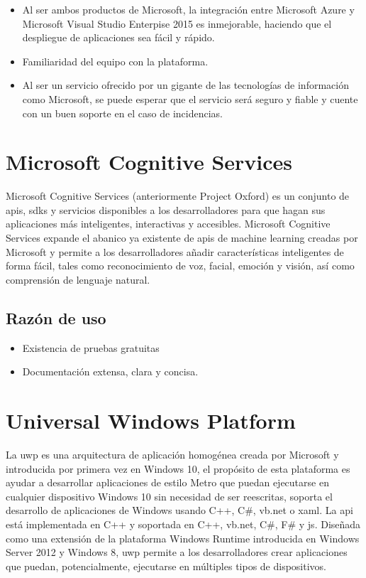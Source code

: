 \begin{itemize}
	\item Al ser ambos productos de Microsoft, la integración entre Microsoft Azure y Microsoft Visual Studio Enterpise 2015 es inmejorable, haciendo que el despliegue de aplicaciones sea fácil y rápido.
	\item Familiaridad del equipo con la plataforma.
	\item Al ser un servicio ofrecido por un gigante de las tecnologías de información como Microsoft, se puede esperar que el servicio será seguro y fiable y cuente con un buen soporte en el caso de incidencias.

\end{itemize}

\section{Microsoft Cognitive Services}

Microsoft Cognitive Services\cite{Oxford} (anteriormente Project Oxford) es un conjunto de \acrshort{api}s, \acrshort{sdk}s y servicios disponibles a los desarrolladores para que hagan sus aplicaciones más inteligentes, interactivas y accesibles. Microsoft Cognitive Services expande el abanico ya existente de \acrshort{api}s de machine learning creadas por Microsoft y permite a los desarrolladores añadir características inteligentes de forma fácil, tales como reconocimiento de voz, facial, emoción y visión, así como comprensión de lenguaje natural.

\subsection{Razón de uso}

\begin{itemize}
	\item Existencia de pruebas gratuitas
	\item Documentación extensa, clara y concisa.

\end{itemize}

\section{Universal Windows Platform}

La \acrfull{uwp}\cite{UWP} es una arquitectura de aplicación homogénea creada por Microsoft y introducida por primera vez en Windows 10, el propósito de esta plataforma es ayudar a desarrollar aplicaciones de estilo Metro que puedan ejecutarse en cualquier dispositivo Windows 10 sin necesidad de ser reescritas, soporta el desarrollo de aplicaciones de Windows usando C++, C\#, \acrshort{vb.net} o \acrshort{xaml}. La \acrshort{api} está implementada en C++ y soportada en C++, \acrshort{vb.net}, C\#, F\# y \acrfull{js}. Diseñada como una extensión de la plataforma Windows Runtime introducida en Windows Server 2012 y Windows 8, \acrshort{uwp} permite a los desarrolladores crear aplicaciones que puedan, potencialmente, ejecutarse en múltiples tipos de dispositivos.

